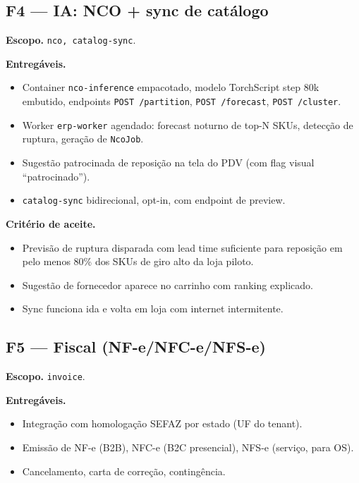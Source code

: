 \documentclass[11pt,a4paper]{article}
\begin{document}
\subsection{F4 --- IA: NCO + sync de catálogo}

\textbf{Escopo.} \texttt{nco, catalog-sync}.

\textbf{Entregáveis.}
\begin{itemize}[leftmargin=2em]
  \item Container \texttt{nco-inference} empacotado, modelo TorchScript
        step 80k embutido, endpoints \texttt{POST /partition},
        \texttt{POST /forecast}, \texttt{POST /cluster}.
  \item Worker \texttt{erp-worker} agendado: forecast noturno de top-N
        SKUs, detecção de ruptura, geração de \texttt{NcoJob}.
  \item Sugestão patrocinada de reposição na tela do PDV (com flag visual
        ``patrocinado'').
  \item \texttt{catalog-sync} bidirecional, opt-in, com endpoint de preview.
\end{itemize}

\textbf{Critério de aceite.}
\begin{itemize}[leftmargin=2em]
  \item Previsão de ruptura disparada com lead time suficiente para
        reposição em pelo menos 80\% dos SKUs de giro alto da loja piloto.
  \item Sugestão de fornecedor aparece no carrinho com ranking explicado.
  \item Sync funciona ida e volta em loja com internet intermitente.
\end{itemize}

\subsection{F5 --- Fiscal (NF-e/NFC-e/NFS-e)}

\textbf{Escopo.} \texttt{invoice}.

\textbf{Entregáveis.}
\begin{itemize}[leftmargin=2em]
  \item Integração com homologação SEFAZ por estado (UF do tenant).
  \item Emissão de NF-e (B2B), NFC-e (B2C presencial), NFS-e (serviço,
        para OS).
  \item Cancelamento, carta de correção, contingência.
\end{itemize}
\end{document}
